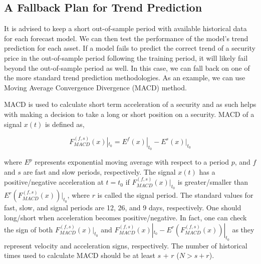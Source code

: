 \documentclass{article}
\begin{document}
\subsection{A Fallback Plan for Trend Prediction}\label{subsection:fallback-macd}

It is advised to keep a short out-of-sample period with available
historical data for each forecast model. We can then test the
performance of the model's trend prediction for each asset. If a model
fails to predict the correct trend of a security price in the
out-of-sample period following the training period, it will likely
fail beyond the out-of-sample period as well. In this case, we can
fall back on one of the more standard trend prediction
methodologies. As an example, we can use Moving Average Convergence
Divergence (MACD) method.

MACD is used to calculate short term acceleration of a security and as
such helps with making a decision to take a long or short position on
a security. MACD of a signal $x(t)$ is defined as,

\begin{equation}\label{eqn:macd}
F_{MACD}^{(f,s)}(x)|_{t_{0}} = E^{f}(x)|_{t_{0}} -
E^{s}(x)|_{t_{0}}
\end{equation}

where $E^{p}$ represents exponential moving average with respect to a
period $p$, and $f$ and $s$ are fast and slow periods,
respectively. The signal $x(t)$ has a positive/negative acceleration
at $t=t_{0}$ if $F_{MACD}^{(f,s)}(x)|_{t_{0}}$ is
greater/smaller than $E^{r}(F_{MACD}^{(f,s)}(x))|_{t_{0}}$, where
$r$ is called the signal period. The standard values for fast, slow,
and signal periods are 12, 26, and 9 days, respectively. One should
long/short when acceleration becomes positive/negative. In fact, one
can check the sign of both $F_{MACD}^{(f,s)}(x)|_{t_{0}}$ and
$F_{MACD}^{(f,s)}(x)|_{t_{0}}-E^{r}(F_{MACD}^{(f,s)}(x))|_{t_{0}}$
as they represent velocity and acceleration signs, respectively. The
number of historical times used to calculate MACD should be at least
$s$ + $r$ ($N > s + r$).
\end{document}
